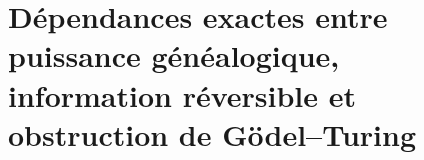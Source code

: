 
\chapter{Dépendances exactes entre puissance généalogique, information réversible et obstruction de Gödel–Turing}
\label{app:integracion-vn64-controles}

\HMTDemoteHeadings

\HMTRestoreHeadings
